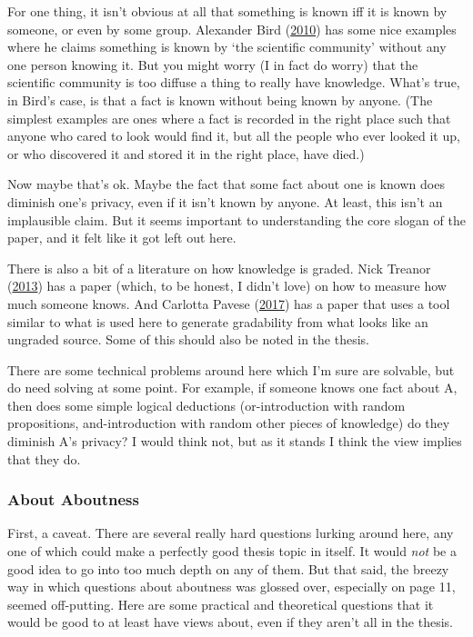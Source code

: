 \documentclass[
  letterpaper,
  DIV=11,
  numbers=noendperiod]{scrartcl}
\begin{document}
For one thing, it isn't obvious at all that something is known iff it is
known by someone, or even by some group. Alexander Bird
(\protect\hyperlink{ref-Bird2010}{2010}) has some nice examples where he
claims something is known by `the scientific community' without any one
person knowing it. But you might worry (I in fact do worry) that the
scientific community is too diffuse a thing to really have knowledge.
What's true, in Bird's case, is that a fact is known without being known
by anyone. (The simplest examples are ones where a fact is recorded in
the right place such that anyone who cared to look would find it, but
all the people who ever looked it up, or who discovered it and stored it
in the right place, have died.)

Now maybe that's ok. Maybe the fact that some fact about one is known
does diminish one's privacy, even if it isn't known by anyone. At least,
this isn't an implausible claim. But it seems important to understanding
the core slogan of the paper, and it felt like it got left out here.

There is also a bit of a literature on how knowledge is graded. Nick
Treanor (\protect\hyperlink{ref-Treanor2013-TRETMO}{2013}) has a paper
(which, to be honest, I didn't love) on how to measure how much someone
knows. And Carlotta Pavese
(\protect\hyperlink{ref-Pavese2017-PAVKAG}{2017}) has a paper that uses
a tool similar to what is used here to generate gradability from what
looks like an ungraded source. Some of this should also be noted in the
thesis.

There are some technical problems around here which I'm sure are
solvable, but do need solving at some point. For example, if someone
knows one fact about A, then does some simple logical deductions
(or-introduction with random propositions, and-introduction with random
other pieces of knowledge) do they diminish A's privacy? I would think
not, but as it stands I think the view implies that they do.

\hypertarget{about-aboutness}{%
\subsubsection{About Aboutness}\label{about-aboutness}}

First, a caveat. There are several really hard questions lurking around
here, any one of which could make a perfectly good thesis topic in
itself. It would \emph{not} be a good idea to go into too much depth on
any of them. But that said, the breezy way in which questions about
aboutness was glossed over, especially on page 11, seemed off-putting.
Here are some practical and theoretical questions that it would be good
to at least have views about, even if they aren't all in the thesis.
\end{document}
